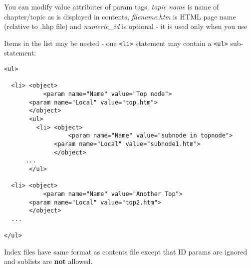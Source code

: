 You can modify value attributes of param tags. {\it topic name} is name of chapter/topic as is displayed in
contents, {\it filename.htm} is HTML page name (relative to .hhp file) and {\it numeric\_id} is optional 
- it is used only when you use 

Items in the list may be nested - one \verb$<li>$ statement may contain a \verb$<ul>$ sub-statement:

\begin{verbatim}
<ul>

  <li> <object>
           <param name="Name" value="Top node">
	   <param name="Local" value="top.htm">
       </object>
       <ul>
         <li> <object>
                  <param name="Name" value="subnode in topnode">
	          <param name="Local" value="subnode1.htm">
              </object>
	  ...
       </ul>
       
  <li> <object>
           <param name="Name" value="Another Top">
	   <param name="Local" value="top2.htm">
       </object>
  ...    

</ul>
\end{verbatim}


Index files have same format as contents file except that ID params are ignored and sublists are {\bf not} 
allowed.

